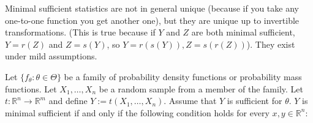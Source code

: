 \begin{remark} Minimal sufficient statistics are not in general unique (because if you take any one-to-one function you get another one), but they are unique up to invertible transformations. (This is true because if \(Y\) and \(Z\) are both minimal sufficient, \(Y = r(Z)\) and \( Z = s(Y)\), so \(Y = r(s(Y)), Z = s(r(Z))\)). They exist under mild assumptions.

\end{remark}

\begin{theorem} Let \(\{f_\theta: \theta \in \Theta\}\) be a family of probability density functions or probability mass functions. Let \(X_1, \ldots, X_n\) be a random sample from a member of the family. Let \(t: \mathbb{R}^n \to \mathbb{R}^m\) and define \(Y:= t(X_1, \ldots, X_n)\). Assume that \(Y\) is sufficient for \(\theta\). \(Y\) is minimal sufficient if and only if the following condition holds for every \(x, y \in \mathbb{R}^n\):


\noindent{}

\end{theorem}

